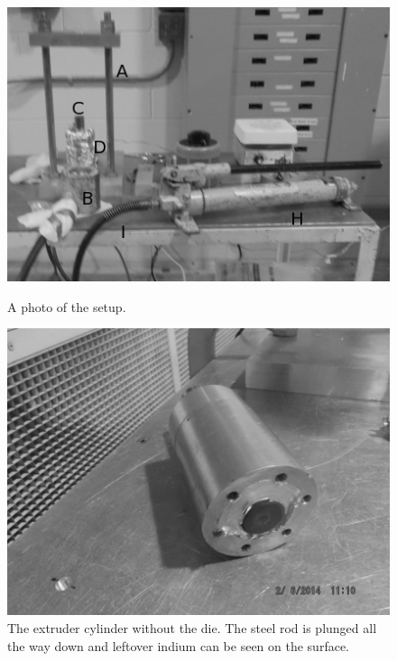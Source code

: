 \begin{figure}
 \centering

\begin{minipage}[b]{0.45\linewidth}
 \includegraphics[width=\linewidth]{img/extruder-setup-photo.png}
 \caption{A photo of the setup.}
 \label{fig:extruder-setup-photo}
\end{minipage}
\quad
\begin{minipage}[b]{0.45\linewidth}
 \includegraphics[width=\linewidth]{img/extruder-cylinder.png}
 \caption{The extruder cylinder without the die.  The steel rod is plunged all the way down and leftover indium can be seen on the surface.}
 \label{fig:extruder-cylinder}
\end{minipage}
\end{figure}


